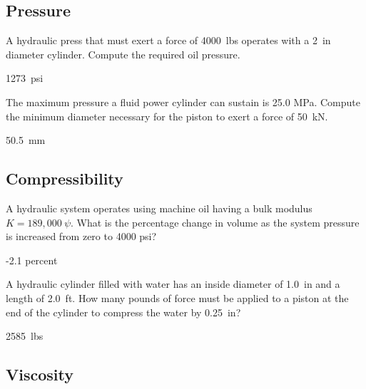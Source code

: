 \documentclass[multi,preview,varwidth=false,border=5,12pt]{standalone}
\begin{document}
\subsection*{Pressure}

\begin{question}
A hydraulic press that must exert a force of 4000~lbs operates with a 2~in diameter cylinder.  Compute the required oil pressure.

\begin{solution}
1273~psi
\end{solution}


\end{question}

\begin{question}
The maximum pressure a fluid power cylinder can sustain is 25.0 MPa.  Compute the minimum diameter necessary for the piston to exert a force of 50~kN.

\begin{solution}
50.5~mm
\end{solution}

\end{question}

\subsection*{Compressibility}

\begin{question}
A hydraulic system operates using machine oil having a bulk modulus $K=189,000~\psi$.  What is the percentage change in volume as the system pressure is increased from zero to 4000 psi?

\begin{solution}
-2.1 percent
\end{solution}

\end{question}

\begin{question}
A hydraulic cylinder filled with water has an inside diameter of 1.0~in and a length of 2.0~ft. How many pounds of force must be applied to a piston at the end of the cylinder to compress the water by 0.25~in?

\begin{solution}
2585~lbs
\end{solution}

\end{question}

\subsection*{Viscosity}
\end{document}
